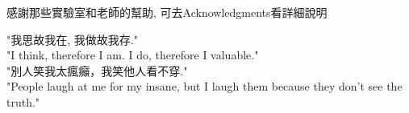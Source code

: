\StartAcknowledgments
\label{acknowledgments-chi}

感謝那些實驗室和老師的幫助, 可去Acknowledgments{}看詳細說明

"我思故我在, 我做故我存."\\
"I think, therefore I am. I do, therefore I valuable."\\

"別人笑我太瘋癲，我笑他人看不穿."\\
"People laugh at me for my insane, but I laugh them because they don't see the truth."\\

\EndAcknowledgments
